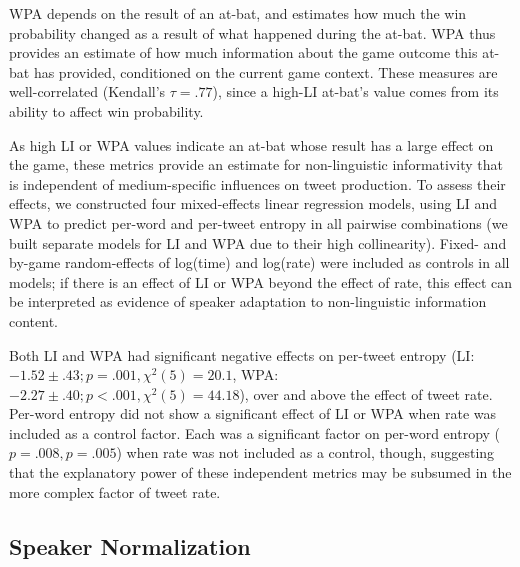 \documentclass[11pt,letterpaper]{article}
\begin{document}
WPA depends on the result of an at-bat, and estimates how much the win probability changed as a result of what happened during the at-bat.  WPA thus provides an estimate of how much information about the game outcome this at-bat has provided, conditioned on the current game context.  These measures are well-correlated (Kendall's $\tau=.77$), since a high-LI at-bat's value comes from its ability to affect win probability.

As high LI or WPA values indicate an at-bat whose result has a large effect on the game, these metrics provide an estimate for non-linguistic informativity that is independent of medium-specific influences on tweet production.  To assess their effects, we constructed four mixed-effects linear regression models, using LI and WPA to predict per-word and per-tweet entropy in all pairwise combinations (we built separate models for LI and WPA due to their high collinearity). Fixed- and by-game random-effects of log(time) and log(rate) were included as controls in all models; if there is an effect of LI or WPA beyond the effect of rate, this effect can be interpreted as evidence of speaker adaptation to non-linguistic information content.

Both LI and WPA had significant negative effects on per-tweet entropy (LI: $-1.52 \pm .43; p=.001, \chi^2(5)=20.1$, WPA: $-2.27 \pm .40; p<.001, \chi^2(5)=44.18$), over and above the effect of tweet rate.  Per-word entropy did not show a significant effect of LI or WPA when rate was included as a control factor. Each was a significant factor on per-word entropy ($p=.008,p=.005$) when rate was not included as a control, though, suggesting that the explanatory power of these independent metrics may be subsumed in the more complex factor of tweet rate.

\subsection{Speaker Normalization}
\label{sect:speaker-normalization}
\end{document}
